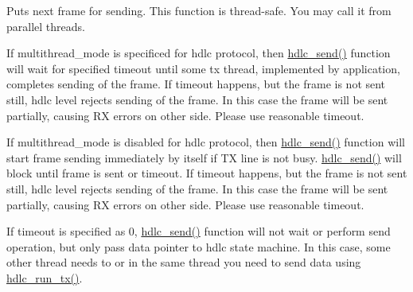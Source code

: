 Puts next frame for sending. This function is thread-\/safe. You may call it from parallel threads.

If multithread\+\_\+mode is specificed for hdlc protocol, then \hyperlink{group__HDLC__API_ga8b5cc456927145cebd82b2b560a6fa10}{hdlc\+\_\+send()} function will wait for specified timeout until some tx thread, implemented by application, completes sending of the frame. If timeout happens, but the frame is not sent still, hdlc level rejects sending of the frame. In this case the frame will be sent partially, causing RX errors on other side. Please use reasonable timeout.

If multithread\+\_\+mode is disabled for hdlc protocol, then \hyperlink{group__HDLC__API_ga8b5cc456927145cebd82b2b560a6fa10}{hdlc\+\_\+send()} function will start frame sending immediately by itself if TX line is not busy. \hyperlink{group__HDLC__API_ga8b5cc456927145cebd82b2b560a6fa10}{hdlc\+\_\+send()} will block until frame is sent or timeout. If timeout happens, but the frame is not sent still, hdlc level rejects sending of the frame. In this case the frame will be sent partially, causing RX errors on other side. Please use reasonable timeout.

If timeout is specified as 0, \hyperlink{group__HDLC__API_ga8b5cc456927145cebd82b2b560a6fa10}{hdlc\+\_\+send()} function will not wait or perform send operation, but only pass data pointer to hdlc state machine. In this case, some other thread needs to or in the same thread you need to send data using \hyperlink{group__HDLC__API_gae31d921043b4f175603114c206b6b829}{hdlc\+\_\+run\+\_\+tx()}.


